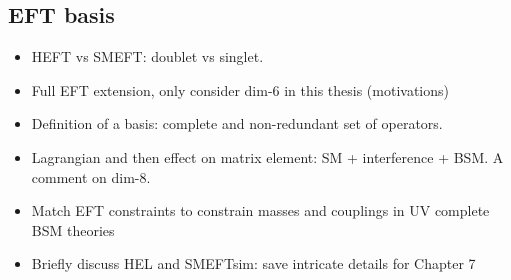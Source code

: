 \subsection{EFT basis}
\begin{itemize}
    \item HEFT vs SMEFT: doublet vs singlet.
    \item Full EFT extension, only consider dim-6 in this thesis (motivations)
    \item Definition of a basis: complete and non-redundant set of operators.
    \item Lagrangian and then effect on matrix element: SM + interference + BSM. A comment on dim-8.
    \item Match EFT constraints to constrain masses and couplings in UV complete BSM theories
    \item Briefly discuss HEL and SMEFTsim: save intricate details for Chapter 7
\end{itemize}